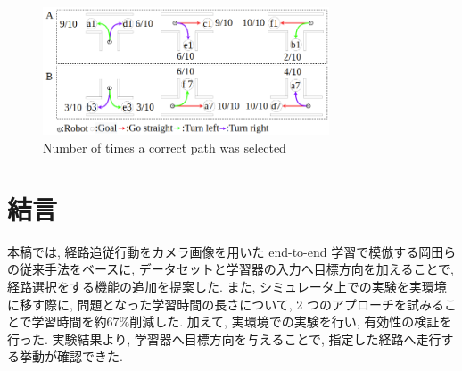 \documentclass{jarticle}
\begin{document}
\begin{figure}[h]
  \centering
   \includegraphics[width=85mm]{real_result.png}
   \vspace*{-4mm}
   \caption{Number of times a correct path was selected}
   \label{fig: fig14}
 \end{figure}

\section{結言}
本稿では, 経路追従行動をカメラ画像を用いた end-to-end 学習で模倣する岡田らの従来手法をベースに, データセットと学習器の入力へ目標方向を加えることで, 経路選択をする機能の追加を提案した. また, シミュレータ上での実験を実環境に移す際に, 問題となった学習時間の長さについて, 2 つのアプローチを試みることで学習時間を約67\%削減した. 加えて, 実環境での実験を行い, 有効性の検証を行った. 実験結果より, 学習器へ目標方向を与えることで, 指定した経路へ走行する挙動が確認できた.


	
\end{document}
